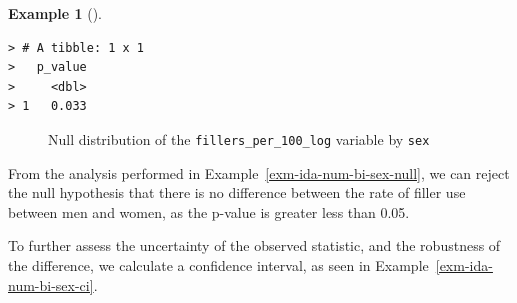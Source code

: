 \documentclass[
  letterpaper,
  DIV=11,
  numbers=noendperiod]{scrreprt}
\theoremstyle{definition}
\newtheorem{example}{Example}[chapter]
\theoremstyle{remark}
\begin{document}
\begin{example}[]
\begin{verbatim}
> # A tibble: 1 x 1
>   p_value
>     <dbl>
> 1   0.033
\end{verbatim}

\begin{figure}[H]


\caption{\label{fig-ida-num-bi-sex-null}Null distribution of the
\texttt{fillers\_per\_100\_log} variable by \texttt{sex}}

\end{figure}%

\end{example}

From the analysis performed in Example~\ref{exm-ida-num-bi-sex-null}, we
can reject the null hypothesis that there is no difference between the
rate of filler use between men and women, as the p-value is greater less
than 0.05.

To further assess the uncertainty of the observed statistic, and the
robustness of the difference, we calculate a confidence interval, as
seen in Example~\ref{exm-ida-num-bi-sex-ci}.
\end{document}
